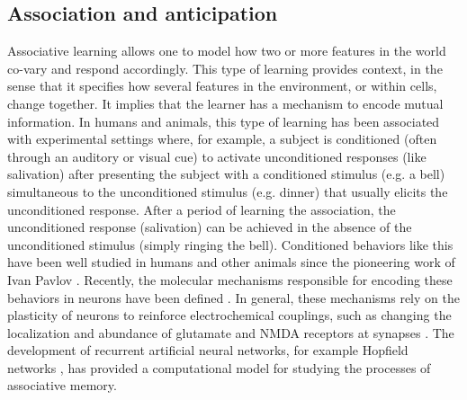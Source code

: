 \subsection{Association and anticipation}

Associative learning allows one to model how two or more features in the world co-vary and respond accordingly. This type of learning provides context, in the sense that it specifies how several features in the environment, or within cells, change together. It implies that the learner has a mechanism to encode mutual information. In humans and animals, this type of learning has been associated with experimental settings where, for example, a subject is conditioned (often through an auditory or visual cue) to activate unconditioned responses (like salivation) after presenting the subject with a conditioned stimulus (e.g. a bell) simultaneous to the unconditioned stimulus (e.g. dinner) that usually elicits the unconditioned response. After a period of learning the association, the unconditioned response (salivation) can be achieved in the absence of the unconditioned stimulus (simply ringing the bell). Conditioned behaviors like this have been well studied in humans and other animals since the pioneering work of Ivan Pavlov \cite{pavlov_conditioned_1927}. Recently, the molecular mechanisms responsible for encoding these behaviors in neurons have been defined \cite{maren_contextual_2013}. In general, these mechanisms rely on the plasticity of neurons to reinforce electrochemical couplings, such as changing the localization and abundance of glutamate and NMDA receptors at synapses \cite{nakazawa_requirement_2002,rumpel_postsynaptic_2005}. The development of recurrent artificial neural networks, for example Hopfield networks \cite{hopfield_neural_1982}, has provided a computational model for studying the processes of associative memory. 


